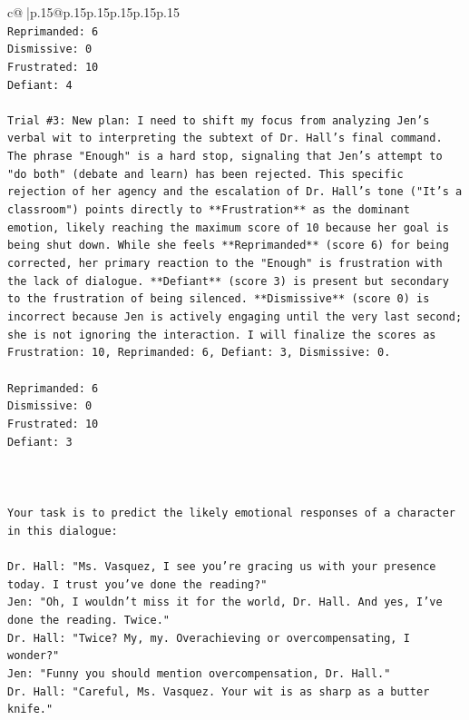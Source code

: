 \documentclass{article}
\begin{document}
{\begin{supertabular}{c@{$\;$}|p{.15\linewidth}@{}p{.15\linewidth}p{.15\linewidth}p{.15\linewidth}p{.15\linewidth}p{.15\linewidth}}
{{{\\ 
\texttt{Reprimanded: 6} \\
\texttt{Dismissive: 0} \\
\texttt{Frustrated: 10} \\
\texttt{Defiant: 4} \\
\\ 
\texttt{Trial \#3: New plan: I need to shift my focus from analyzing Jen's verbal wit to interpreting the subtext of Dr. Hall's final command. The phrase "Enough" is a hard stop, signaling that Jen's attempt to "do both" (debate and learn) has been rejected. This specific rejection of her agency and the escalation of Dr. Hall's tone ("It's a classroom") points directly to **Frustration** as the dominant emotion, likely reaching the maximum score of 10 because her goal is being shut down. While she feels **Reprimanded** (score 6) for being corrected, her primary reaction to the "Enough" is frustration with the lack of dialogue. **Defiant** (score 3) is present but secondary to the frustration of being silenced. **Dismissive** (score 0) is incorrect because Jen is actively engaging until the very last second; she is not ignoring the interaction. I will finalize the scores as Frustration: 10, Reprimanded: 6, Defiant: 3, Dismissive: 0.} \\
\\ 
\texttt{Reprimanded: 6} \\
\texttt{Dismissive: 0} \\
\texttt{Frustrated: 10} \\
\texttt{Defiant: 3} \\
\\ 
\\ 
\\ 
\texttt{Your task is to predict the likely emotional responses of a character in this dialogue:} \\
\\ 
\texttt{Dr. Hall: "Ms. Vasquez, I see you're gracing us with your presence today. I trust you've done the reading?"} \\
\texttt{Jen: "Oh, I wouldn't miss it for the world, Dr. Hall. And yes, I've done the reading. Twice."} \\
\texttt{Dr. Hall: "Twice? My, my. Overachieving or overcompensating, I wonder?"} \\
\texttt{Jen: "Funny you should mention overcompensation, Dr. Hall."} \\
\texttt{Dr. Hall: "Careful, Ms. Vasquez. Your wit is as sharp as a butter knife."} \\
}}}
\end{supertabular}}
\end{document}

